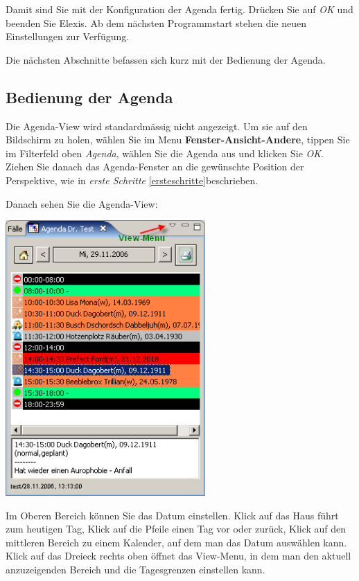Damit sind Sie mit der Konfiguration der Agenda fertig. Drücken Sie auf \textit{OK} und beenden Sie Elexis. Ab dem nächsten Programmstart stehen die neuen Einstellungen zur Verfügung.

Die nächsten Abschnitte befassen sich kurz mit der Bedienung der Agenda.
\subsection{Bedienung der Agenda}

Die Agenda-View wird standardmässig nicht angezeigt. Um sie auf den Bildschirm zu holen, wählen Sie im Menu
 \textbf{Fenster-Ansicht-Andere}, tippen Sie im Filterfeld oben \textit{Agenda}, wählen Sie die Agenda aus und
 klicken Sie \textit{OK}. Ziehen Sie danach das Agenda-Fenster an die
 gewünschte Position der Perspektive, wie in \textit{erste Schritte} \ref{ersteschritte}beschrieben.

Danach sehen Sie die Agenda-View:

\includegraphics[width=3in]{images/use2.png}


Im Oberen Bereich können Sie das Datum einstellen. Klick auf das Haus führt zum heutigen Tag, Klick auf die Pfeile einen Tag vor oder
zurück, Klick auf den mittleren Bereich zu einem Kalender, auf dem man das Datum auswählen kann.
Klick auf das Dreieck rechts oben öffnet das View-Menu, in dem man den aktuell anzuzeigenden Bereich und die Tagesgrenzen
einstellen kann.

